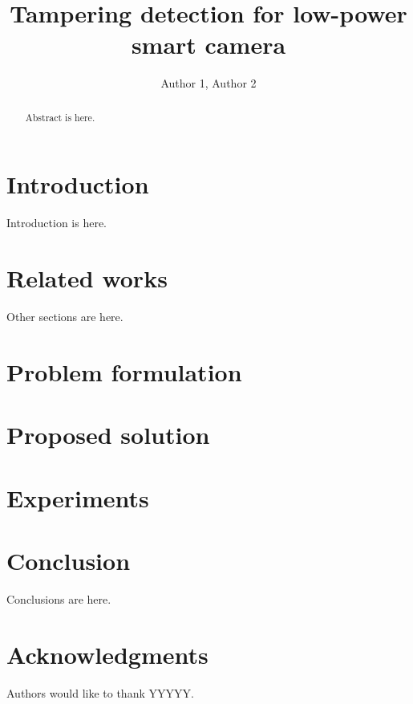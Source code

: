 \documentclass{llncs}
\begin{document}
\title{Tampering detection for low-power smart camera}

\author{Author 1, Author 2}

\maketitle

\begin{abstract}
	
	Abstract is here.
	
\end{abstract}

\section{Introduction}\label{sec:introduction}

Introduction is here.

\section{Related works}\label{sec:relWorks}

Other sections are here. 

\section{Problem formulation}\label{sec:probForm}

\section{Proposed solution}\label{sec:propSol}

\section{Experiments}\label{sec:experiments}

\section{Conclusion}\label{sec:Conclusion}

Conclusions are here.

\section*{Acknowledgments}\label{sec:Acknowledgments}

Authors would like to thank YYYYY.



%	
%	
\end{document}
